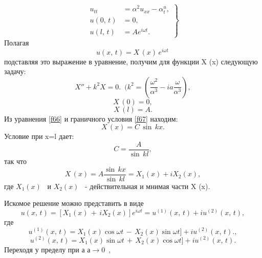 \documentclass[a4paper, 12pt]{article}
\begin{document}
\begin{equation}
\left.
\begin{array}{ll}
 u_{tt} &= \alpha^2u_{xx}-\alpha^u_{t},\\
 u(0,\,t) &=0,\\
 u(l,\,t) &= Ae^{i\omega t}.
\end{array}
\right\}
\end{equation}
Полагая
\begin{displaymath} u(x,\,t)= X\,(x)\, e^{i\omega t}\,\end{displaymath}
 подставляя это выражение в уравнение, получим для функции X (x) следующую задачу:
 \begin{equation} \label{f66}X''+k^{2}X=0.\,\,\,(k^{2}=\left(\frac{\omega^2}{\alpha^3}-ia\frac{\omega}{\alpha^3}\right),
\end{equation}
 \begin{equation} \label{f67}X\,(0)=0,
\end{equation}
 \begin{equation} \label{f68}X\,(l)=A.
\end{equation}
Из уравнения \eqref{f66} и граничного условия \eqref{f67} находим:
 \begin{displaymath} X\,(x)=C\,\sin\,kx.
\end{displaymath}
Условие при x=l дает: \begin{equation} \label{f69}C=\frac{A}{\sin\,kl},
\end{equation}
так что\begin{equation} \label{f70} X\,(x)=A\frac{\sin\,kx}{\sin\,kl}=X_{1}(x)+iX_{2}(x),
\end{equation}
где \(X_{1}(x)\) \, и  \(X_{2}(x)\) \,  - действительная и мнимая части X (x).

Искомое решение можно представить в виде  \begin{displaymath}
u(x,\,t)=[X_{1}(x)\,+\,iX_{2}(x)]e^{i\omega t}=u^{(1)}(x,\,t)+iu^{(2)}(x,\,t),
\end{displaymath}
где \begin{displaymath}
u^{(1)}(x,\,t)=X_{1}(x)\cos\omega t\,-\,X_{2}(x)\sin\omega t]+iu^{(2)}(x,\,t).,
\end{displaymath}
\begin{displaymath}
u^{(2)}(x,\,t)=X_{1}(x)\sin\omega t\,+\,X_{2}(x)\cos\omega t]+iu^{(2)}(x,\,t).
\end{displaymath}
Переходя у пределу при а \( а \to 0\) \,, 
\end{document}
